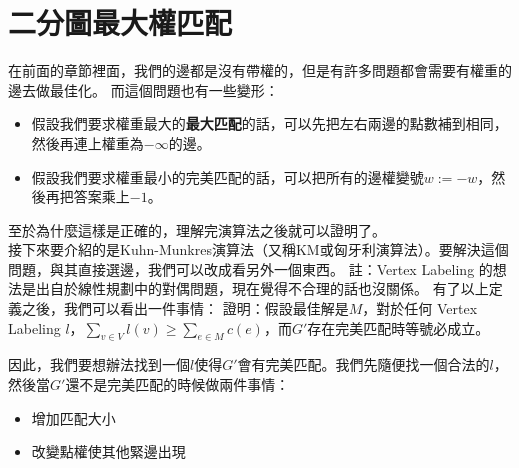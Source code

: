 \documentclass[main.tex]{subfiles}
\begin{document}
\section{二分圖最大權匹配}
在前面的章節裡面，我們的邊都是沒有帶權的，但是有許多問題都會需要有權重的邊去做最佳化。
而這個問題也有一些變形：
\begin{itemize}
    \item 假設我們要求權重最大的\textbf{最大匹配}的話，可以先把左右兩邊的點數補到相同，然後再連上權重為$- \infty$的邊。
    \item 假設我們要求權重最小的完美匹配的話，可以把所有的邊權變號$w := -w$，然後再把答案乘上$-1$。
\end{itemize}
至於為什麼這樣是正確的，理解完演算法之後就可以證明了。 \\
接下來要介紹的是Kuhn-Munkres演算法（又稱KM或匈牙利演算法）。要解決這個問題，與其直接選邊，我們可以改成看另外一個東西。
註：Vertex Labeling 的想法是出自於線性規劃中的對偶問題，現在覺得不合理的話也沒關係。
有了以上定義之後，我們可以看出一件事情：
證明：假設最佳解是$M$，對於任何 Vertex Labeling $l$，$\sum_{v \in V} l(v) \geq \sum_{e \in M} c(e)$，而$G'$存在完美匹配時等號必成立。
\par 因此，我們要想辦法找到一個$l$使得$G'$會有完美匹配。我們先隨便找一個合法的$l$，然後當$G'$還不是完美匹配的時候做兩件事情：
\begin{itemize}
    \item 增加匹配大小
    \item 改變點權使其他緊邊出現
\end{itemize}
\end{document}
